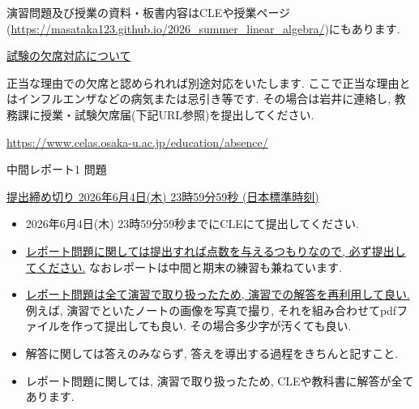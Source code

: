 \documentclass[dvipdfmx,a4paper,11pt]{article} %
\theoremstyle{definition}
\begin{document}
演習問題及び授業の資料・板書内容はCLEや授業ページ(\url{https://masataka123.github.io/2026_summer_linear_algebra/})にもあります. 



\underline{試験の欠席対応について } 

正当な理由での欠席と認められれば別途対応をいたします. ここで正当な理由とはインフルエンザなどの病気または忌引き等です. その場合は岩井に連絡し, 教務課に授業・試験欠席届(下記URL参照)を提出してください.
\begin{center}
\url{https://www.celas.osaka-u.ac.jp/education/absence/}
\end{center}

\newpage


  \begin{center}
 {\Large 中間レポート1 問題}

{ \large \underline{提出締め切り 2026年6月4日(木) 23時59分59秒 (日本標準時刻)}}
\end{center}


\begin{itemize}
 \setlength{\parskip}{0cm}
  \setlength{\itemsep}{0pt} 
  \item 2026年6月4日(木) 23時59分59秒までにCLEにて提出してください.  
  \item \underline{レポート問題に関しては提出すれば点数を与えるつもりなので, 必ず提出してください.} なおレポートは中間と期末の練習も兼ねています. 
  \item \underline{レポート問題は全て演習で取り扱ったため, 演習での解答を再利用して良い.} 例えば, 演習でといたノートの画像を写真で撮り, それを組み合わせてpdfファイルを作って提出しても良い. その場合多少字が汚くても良い. 
\item 解答に関しては答えのみならず, 答えを導出する過程をきちんと記すこと. 
\item レポート問題に関しては, 演習で取り扱ったため, CLEや教科書に解答が全てあります. 
\end{itemize}
\end{document}
